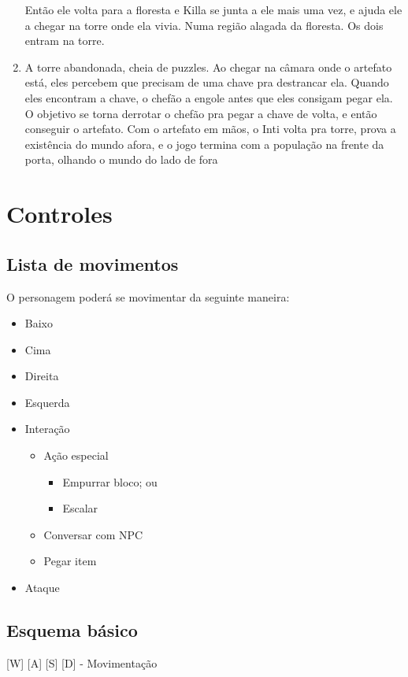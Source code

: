 \documentclass[12pt]{article}
\begin{document}
\begin{enumerate}
Então ele volta para a floresta e Killa se junta a ele mais uma vez, e ajuda ele a chegar na torre onde ela vivia. Numa região alagada da floresta. Os dois entram na torre.
\item A torre abandonada, cheia de puzzles. Ao chegar na câmara onde o artefato está, eles percebem que precisam de uma chave pra destrancar ela. Quando eles encontram a chave, o chefão a engole antes que eles consigam pegar ela. O objetivo se torna derrotar o chefão pra pegar a chave de volta, e então conseguir o artefato.
Com o artefato em mãos, o Inti volta pra torre, prova a existência do mundo afora, e o jogo termina com a população na frente da porta, olhando o mundo do lado de fora
\end{enumerate}
\section{Controles}

\subsection{Lista de movimentos}
O personagem poderá se movimentar da seguinte maneira:

\begin{itemize}
    \item Baixo
    \item Cima
    \item Direita
    \item Esquerda
    \item Interação
    \begin{itemize}
        \item Ação especial
        \begin{itemize}
            \item Empurrar bloco; ou
            \item Escalar
        \end{itemize}
        \item Conversar com NPC
        \item Pegar item
    \end{itemize}
    \item Ataque
\end{itemize}

\subsection{Esquema básico}

[W] [A] [S] [D] - Movimentação
\end{document}
